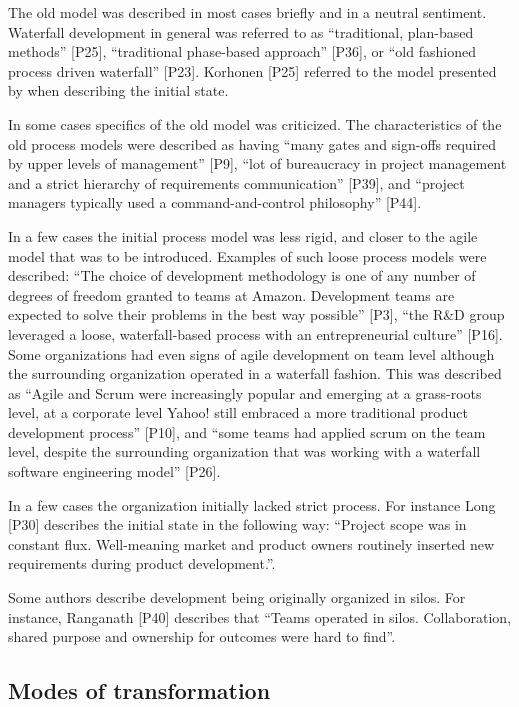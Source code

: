 The old model was described in most cases briefly and in a neutral sentiment.
Waterfall development in general was referred to as ``traditional, plan-based
methods'' [P25], ``traditional phase-based approach'' [P36], or ``old fashioned
process driven waterfall'' [P23]. Korhonen [P25] referred to the model presented
by \citet{Royce1970} when describing the initial state.

In some cases specifics of the old model was criticized. The characteristics of
the old process models were described as having ``many gates and sign-offs
required by upper levels of management'' [P9], ``lot of bureaucracy in project
management and a strict hierarchy of requirements communication'' [P39], and
``project managers typically used a command-and-control philosophy'' [P44].

In a few cases the initial process model was less rigid, and closer to the agile
model that was to be introduced. Examples of such loose process models were
described: ``The choice of development methodology is one of any number of
degrees of freedom granted to teams at Amazon. Development teams are expected to
solve their problems in the best way possible'' [P3], ``the R\&D group leveraged
a loose, waterfall-based process with an entrepreneurial culture'' [P16]. Some
organizations had even signs of agile development on team level although the
surrounding organization operated in a waterfall fashion. This was described as
``Agile and Scrum were increasingly popular and emerging at a grass-roots level,
at a corporate level Yahoo! still embraced a more traditional product
development process'' [P10], and ``some teams had applied scrum on the team
level, despite the surrounding organization that was working with a waterfall
software engineering model'' [P26].

In a few cases the organization initially lacked strict process. For instance
Long [P30] describes the initial state in the following way: ``Project scope was
in constant flux. Well-meaning market and product owners routinely inserted new
requirements during product development.''.

Some authors describe development being originally organized in silos. For
instance, Ranganath [P40] describes that ``Teams operated in silos.
Collaboration, shared purpose and ownership for outcomes were hard to find''.


\subsection{Modes of transformation}

